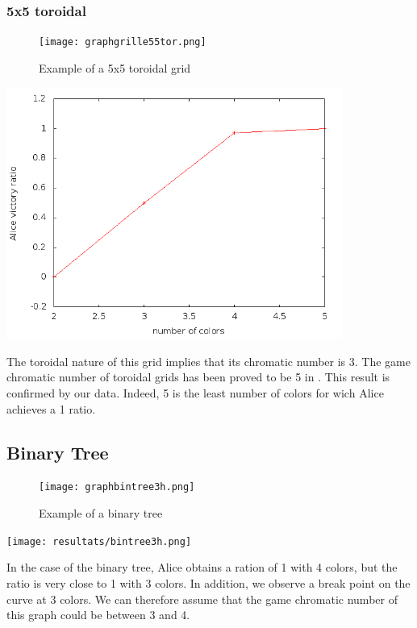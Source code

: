 \subsubsection{5x5 toroidal}

\begin{figure}[h]
\begin{center}  
	\texttt{[image: graphgrille55tor.png]}
\end{center}
    \caption{Example of a 5x5 toroidal grid}
    \label{grid55tor}
\end{figure}

\includegraphics[width=11cm]{resultats/grilletor55.png}

The toroidal nature of this grid implies that its chromatic number is 3. The game chromatic number of toroidal grids has been proved to be 5 in \cite{Raspaud20091183}. This result is confirmed by our data. Indeed, 5 is the least number of colors for wich Alice achieves a 1 ratio.

\subsection{Binary Tree}

\begin{figure}[h]
\begin{center}  
	\texttt{[image: graphbintree3h.png]}
\end{center}
    \caption{Example of a binary tree}
    \label{btree}
\end{figure}

\texttt{[image: resultats/bintree3h.png]}

In the case of the binary tree, Alice obtains a ration of 1 with 4 colors, but the ratio is very close to 1 with 3 colors. In addition, we observe a break point on the curve at 3 colors. We can therefore assume that the game chromatic number of this graph could be between 3 and 4.

